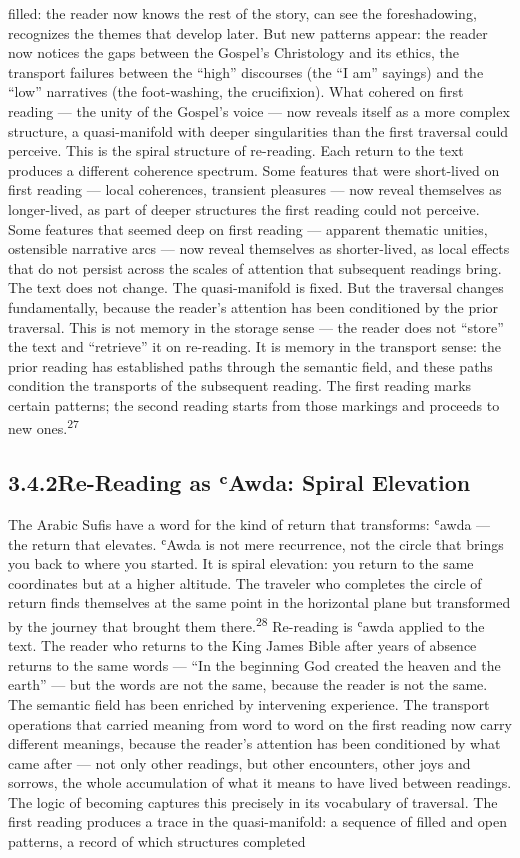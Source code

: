 filled: the reader now knows the rest of the story, can see the foreshadowing, recognizes the themes that develop later. But new patterns appear: the reader now notices the gaps between the Gospel’s Christology and its ethics, the transport failures between the “high” discourses (the “I am” sayings) and the “low” narratives (the foot-washing, the crucifixion). What cohered on first reading — the unity of the Gospel’s voice — now reveals itself as a more complex structure, a quasi-manifold with deeper singularities than the first traversal could perceive. This is the spiral structure of re-reading. Each return to the text produces a different coherence spectrum. Some features that were short-lived on first reading — local coherences, transient pleasures — now reveal themselves as longer-lived, as part of deeper structures the first reading could not perceive. Some features that seemed deep on first reading — apparent thematic unities, ostensible narrative arcs — now reveal themselves as shorter-lived, as local effects that do not persist across the scales of attention that subsequent readings bring. The text does not change. The quasi-manifold is fixed. But the traversal changes fundamentally, because the reader’s attention has been conditioned by the prior traversal. This is not memory in the storage sense — the reader does not “store” the text and “retrieve” it on re-reading. It is memory in the transport sense: the prior reading has established paths through the semantic field, and these paths condition the transports of the subsequent reading. The first reading marks certain patterns; the second reading starts from those markings and proceeds to new ones.\textsuperscript{27}

\subsection{3.4.2\quad Re-Reading as ʿAwda: Spiral Elevation}

The Arabic Sufis have a word for the kind of return that transforms: ʿawda — the return that elevates. ʿAwda is not mere recurrence, not the circle that brings you back to where you started. It is spiral elevation: you return to the same coordinates but at a higher altitude. The traveler who completes the circle of return finds themselves at the same point in the horizontal plane but transformed by the journey that brought them there.\textsuperscript{28} Re-reading is ʿawda applied to the text. The reader who returns to the King James Bible after years of absence returns to the same words — “In the beginning God created the heaven and the earth” — but the words are not the same, because the reader is not the same. The semantic field has been enriched by intervening experience. The transport operations that carried meaning from word to word on the first reading now carry different meanings, because the reader’s attention has been conditioned by what came after — not only other readings, but other encounters, other joys and sorrows, the whole accumulation of what it means to have lived between readings. The logic of becoming captures this precisely in its vocabulary of traversal. The first reading produces a trace in the quasi-manifold: a sequence of filled and open patterns, a record of which structures completed

